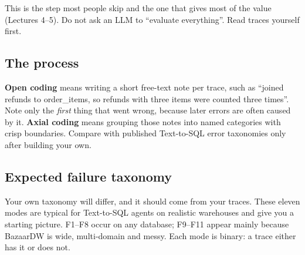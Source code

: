 \documentclass[11pt,a4paper]{article}
\begin{document}
This is the step most people skip and the one that gives most of the value (Lectures 4--5). Do
not ask an LLM to ``evaluate everything''. Read traces yourself first.

\subsection{The process}

\begin{center}
\end{center}

\textbf{Open coding} means writing a short free-text note per trace, such as ``joined refunds
to order\_items, so refunds with three items were counted three times''. Note only the
\emph{first} thing that went wrong, because later errors are often caused by it.
\textbf{Axial coding} means grouping those notes into named categories with crisp boundaries.
Compare with published Text-to-SQL error taxonomies only after building your own.

\subsection{Expected failure taxonomy}

Your own taxonomy will differ, and it should come from your traces. These eleven modes are
typical for Text-to-SQL agents on realistic warehouses and give you a starting picture. F1--F8 occur
on any database; F9--F11 appear mainly because BazaarDW is wide, multi-domain and messy. Each mode is
binary: a trace either has it or does not.
\end{document}

